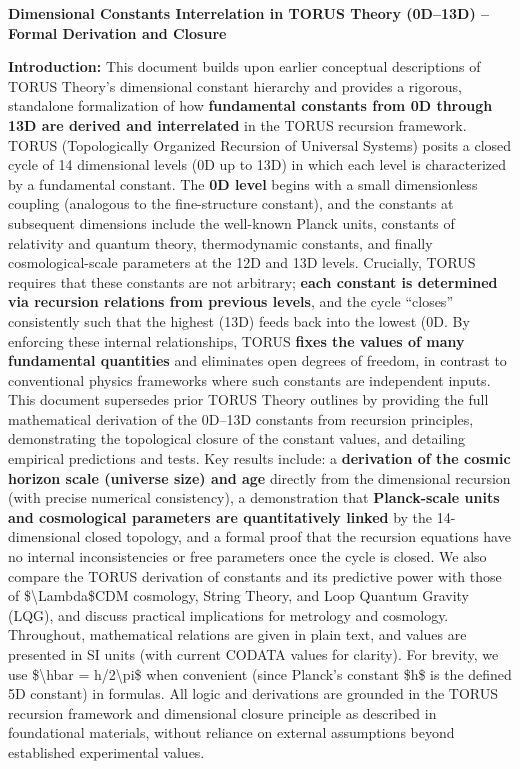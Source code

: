 \documentclass[]{article}
\date{}
\begin{document}
\textbf{Dimensional Constants Interrelation in TORUS Theory (0D--13D) --
Formal Derivation and Closure}

\textbf{Introduction:} This document builds upon earlier conceptual
descriptions of TORUS Theory's dimensional constant hierarchy and
provides a rigorous, standalone formalization of how \textbf{fundamental
constants from 0D through 13D are derived and interrelated} in the TORUS
recursion framework. TORUS (Topologically Organized Recursion of
Universal Systems) posits a closed cycle of 14 dimensional levels (0D up
to 13D) in which each level is characterized by a fundamental constant.
The \textbf{0D level} begins with a small dimensionless coupling
(analogous to the fine-structure constant), and the constants at
subsequent dimensions include the well-known Planck units, constants of
relativity and quantum theory, thermodynamic constants, and finally
cosmological-scale parameters at the 12D and 13D levels. Crucially,
TORUS requires that these constants are not arbitrary; \textbf{each
constant is determined via recursion relations from previous levels},
and the cycle ``closes'' consistently such that the highest (13D) feeds
back into the lowest (0D​. By enforcing these internal relationships,
TORUS \textbf{fixes the values of many fundamental quantities} and
eliminates open degrees of freedom, in contrast to conventional physics
frameworks where such constants are independent inputs​. This document
supersedes prior TORUS Theory outlines by providing the full
mathematical derivation of the 0D--13D constants from recursion
principles, demonstrating the topological closure of the constant
values, and detailing empirical predictions and tests. Key results
include: a \textbf{derivation of the cosmic horizon scale (universe
size) and age} directly from the dimensional recursion (with precise
numerical consistency), a demonstration that \textbf{Planck-scale units
and cosmological parameters are quantitatively linked} by the
14-dimensional closed topology, and a formal proof that the recursion
equations have no internal inconsistencies or free parameters once the
cycle is closed. We also compare the TORUS derivation of constants and
its predictive power with those of \$\textbackslash{}Lambda\$CDM
cosmology, String Theory, and Loop Quantum Gravity (LQG), and discuss
practical implications for metrology and cosmology. Throughout,
mathematical relations are given in plain text, and values are presented
in SI units (with current CODATA values for clarity). For brevity, we
use \$\textbackslash{}hbar = h/2\textbackslash{}pi\$ when convenient
(since Planck's constant \$h\$ is the defined 5D constant) in formulas.
All logic and derivations are grounded in the TORUS recursion framework
and dimensional closure principle as described in foundational
materials, without reliance on external assumptions beyond established
experimental values.
\end{document}

